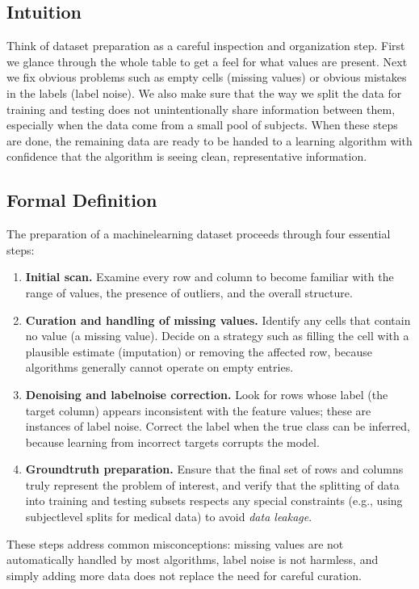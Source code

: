 \documentclass[12pt, a4paper]{article}
\begin{document}
\subsection{Intuition}
Think of dataset preparation as a careful inspection and organization step.  
First we glance through the whole table to get a feel for what values are present.  
Next we fix obvious problems such as empty cells (missing values) or obvious mistakes in the labels (label noise).  
We also make sure that the way we split the data for training and testing does not unintentionally share information between them, especially when the data come from a small pool of subjects.  
When these steps are done, the remaining data are ready to be handed to a learning algorithm with confidence that the algorithm is seeing clean, representative information.  

\subsection{Formal Definition}
The preparation of a machinelearning dataset proceeds through four essential steps:

\begin{enumerate}
\item \textbf{Initial scan.} Examine every row and column to become familiar with the range of values, the presence of outliers, and the overall structure.
\item \textbf{Curation and handling of missing values.} Identify any cells that contain no value (a missing value). Decide on a strategy such as filling the cell with a plausible estimate (imputation) or removing the affected row, because algorithms generally cannot operate on empty entries.
\item \textbf{Denoising and labelnoise correction.} Look for rows whose label (the target column) appears inconsistent with the feature values; these are instances of label noise. Correct the label when the true class can be inferred, because learning from incorrect targets corrupts the model.
\item \textbf{Groundtruth preparation.} Ensure that the final set of rows and columns truly represent the problem of interest, and verify that the splitting of data into training and testing subsets respects any special constraints (e.g., using subjectlevel splits for medical data) to avoid \textit{data leakage}.
\end{enumerate}

These steps address common misconceptions: missing values are not automatically handled by most algorithms, label noise is not harmless, and simply adding more data does not replace the need for careful curation.  
\end{document}

